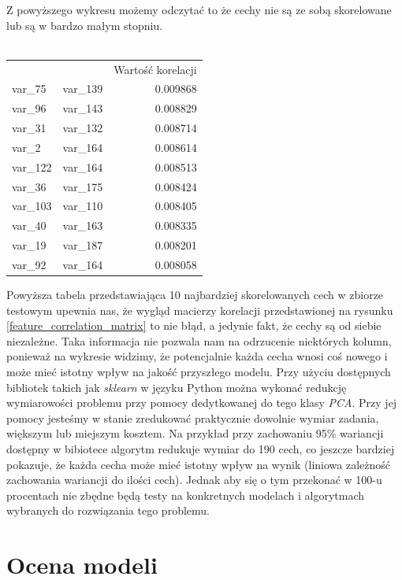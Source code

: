 \documentclass[12pt]{article}
\begin{document}
Z powyższego wykresu możemy odczytać to że cechy nie są ze sobą skorelowane lub są w bardzo małym stopniu. \\
\\
\begin{tabular}{llr}
   &   &        Wartość korelacji \\
var\_75 & var\_139 &  0.009868 \\
var\_96 & var\_143 &  0.008829 \\
var\_31 & var\_132 &  0.008714 \\
var\_2 & var\_164 &  0.008614 \\
var\_122 & var\_164 &  0.008513 \\
var\_36 & var\_175 &  0.008424 \\
var\_103 & var\_110 &  0.008405 \\
var\_40 & var\_163 &  0.008335 \\
var\_19 & var\_187 &  0.008201 \\
var\_92 & var\_164 &  0.008058 \\
\end{tabular}

Powyższa tabela przedstawiająca 10 najbardziej skorelowanych cech w zbiorze testowym upewnia nas, że wygląd macierzy korelacji przedstawionej na rysunku \ref{feature_correlation_matrix} to nie błąd, a jedynie fakt, że cechy są od siebie niezależne.
Taka informacja nie pozwala nam na odrzucenie niektórych kolumn, ponieważ na wykresie widzimy, że potencjalnie każda cecha wnosi coś nowego i może mieć istotny wpływ na jakość przyszłego modelu.
\newline
Przy użyciu dostępnych bibliotek takich jak \textit{sklearn} w języku Python można wykonać redukcję wymiarowości problemu przy pomocy dedytkowanej do tego klasy \textit{PCA}. Przy jej pomocy jesteśmy w stanie zredukować praktycznie dowolnie wymiar zadania, większym lub miejszym kosztem.
Na przykład przy zachowaniu 95\% wariancji dostępny w bibiotece algorytm redukuje wymiar do 190 cech, co jeszcze bardziej pokazuje, że każda cecha może mieć istotny wpływ na wynik (liniowa zależność zachowania wariancji do ilości cech). Jednak aby się o tym przekonać w 100-u procentach nie zbędne będą testy na konkretnych modelach i algorytmach wybranych do rozwiązania tego problemu.

\section{Ocena modeli}
\end{document}
